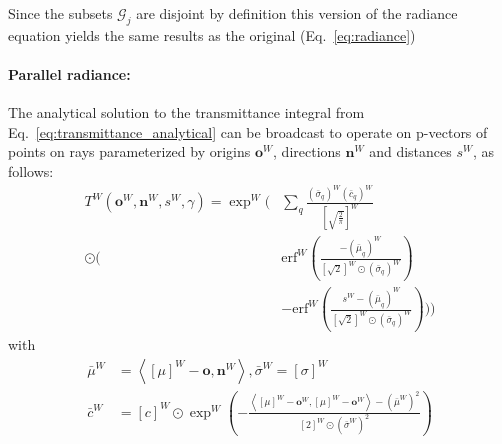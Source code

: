 \documentclass[a4paper, 11pt]{memoir}
\newcommand*{\erf}{\text{erf}}
\begin{document}
    Since the subsets $\mathcal{G}_j$ are disjoint by definition this version of the \gls{radiance} equation yields the same results as the original (Eq.~\eqref{eq:radiance})

    \paragraph{Parallel \gls{radiance}:}
    \label{par:parallel_radiance}
    The analytical solution to the \gls{transmittance} integral from Eq.~\eqref{eq:transmittance_analytical} can be broadcast
    to operate on p-vectors of points on rays parameterized by origins $\mathbf{o}^W$, directions $\mathbf{n}^W$
    and distances $s^W$, as follows:
    \begin{equation}
        \begin{aligned}
            T^W(\mathbf{o}^W, \mathbf{n}^W, s^W, \gamma) = \exp^W\Bigg(& \sum_q \frac{(\bar{\sigma}_q)^W
            (\bar{c}_q)^W}{\left[ \sqrt{\frac{2}{\pi}} \right]^W} \\
            \odot \Bigg(& \erf^W{\left( \frac{-(\bar{\mu}_q)^W}{[ \sqrt{2} ]^W \odot (\bar{\sigma}_q)^W} \right)}\\
            &- \erf^W{\left( \frac{s^W - (\bar{\mu}_q)^W}{[ \sqrt{2} ]^W \odot (\bar{\sigma}_q)^W} \right)} \Bigg) \Bigg) 
        \end{aligned}
        \label{eq:transmittance_broadcast}
    \end{equation}
    with
    \begin{align*}
        \bar{\mu}^W &= \left\langle [ \mu ]^W - \mathbf{o}, \mathbf{n}^W \right\rangle, \bar{\sigma}^W = \left[ \sigma \right]^W\\
        \bar{c}^W &= [c]^W \odot \exp^W{\left( - \frac{\left\langle [\mu]^W - \mathbf{o}^W, [\mu]^W - \mathbf{o}^W \right\rangle
    - \left(\bar{\mu}^W\right)^2}{[2]^W \odot \left(\bar{\sigma}^W\right)^2} \right)}
    \end{align*}
\end{document}
